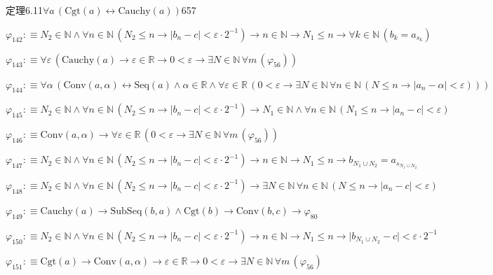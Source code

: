 \begin{fullproof}{定理6.11}{$\forall a\,(\mathrm{Cgt}(a) \leftrightarrow \mathrm{Cauchy}(a))$}{657}
\begin{abbrevlist}
\item $\varphi_{142} :\equiv N_{2} \in \mathbb{N} \land \forall n \in \mathbb{N}\,(N_{2} \leq n \to \lvert b_{n} - c \rvert < \varepsilon \cdot 2^{-1}) \to n \in \mathbb{N} \to N_{1} \leq n \to \forall k \in \mathbb{N}\,(b_{k} = a_{s_{k}})$
\item $\varphi_{143} :\equiv \forall \varepsilon\,(\mathrm{Cauchy}(a) \to \varepsilon \in \mathbb{R} \to 0 < \varepsilon \to \exists N \in \mathbb{N}\,\forall m\,(\varphi_{56}))$
\item $\varphi_{144} :\equiv \forall \alpha\,(\mathrm{Conv}(a,\alpha) \leftrightarrow \mathrm{Seq}(a) \land \alpha \in \mathbb{R} \land \forall \varepsilon \in \mathbb{R}\,(0 < \varepsilon \to \exists N \in \mathbb{N}\,\forall n \in \mathbb{N}\,(N \leq n \to \lvert a_{n} - \alpha \rvert < \varepsilon)))$
\item $\varphi_{145} :\equiv N_{2} \in \mathbb{N} \land \forall n \in \mathbb{N}\,(N_{2} \leq n \to \lvert b_{n} - c \rvert < \varepsilon \cdot 2^{-1}) \to N_{1} \in \mathbb{N} \land \forall n \in \mathbb{N}\,(N_{1} \leq n \to \lvert a_{n} - c \rvert < \varepsilon)$
\item $\varphi_{146} :\equiv \mathrm{Conv}(a,\alpha) \to \forall \varepsilon \in \mathbb{R}\,(0 < \varepsilon \to \exists N \in \mathbb{N}\,\forall m\,(\varphi_{56}))$
\item $\varphi_{147} :\equiv N_{2} \in \mathbb{N} \land \forall n \in \mathbb{N}\,(N_{2} \leq n \to \lvert b_{n} - c \rvert < \varepsilon \cdot 2^{-1}) \to n \in \mathbb{N} \to N_{1} \leq n \to b_{N_{1} \cup N_{2}} = a_{s_{N_{1} \cup N_{2}}}$
\item $\varphi_{148} :\equiv N_{2} \in \mathbb{N} \land \forall n \in \mathbb{N}\,(N_{2} \leq n \to \lvert b_{n} - c \rvert < \varepsilon \cdot 2^{-1}) \to \exists N \in \mathbb{N}\,\forall n \in \mathbb{N}\,(N \leq n \to \lvert a_{n} - c \rvert < \varepsilon)$
\item $\varphi_{149} :\equiv \mathrm{Cauchy}(a) \to \mathrm{SubSeq}(b,a) \land \mathrm{Cgt}(b) \to \mathrm{Conv}(b,c) \to \varphi_{80}$
\item $\varphi_{150} :\equiv N_{2} \in \mathbb{N} \land \forall n \in \mathbb{N}\,(N_{2} \leq n \to \lvert b_{n} - c \rvert < \varepsilon \cdot 2^{-1}) \to n \in \mathbb{N} \to N_{1} \leq n \to \lvert b_{N_{1} \cup N_{2}} - c \rvert < \varepsilon \cdot 2^{-1}$
\item $\varphi_{151} :\equiv \mathrm{Cgt}(a) \to \mathrm{Conv}(a,\alpha) \to \varepsilon \in \mathbb{R} \to 0 < \varepsilon \to \exists N \in \mathbb{N}\,\forall m\,(\varphi_{56})$

\end{abbrevlist}
\end{fullproof}
